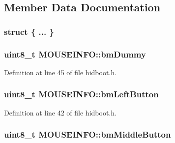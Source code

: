 \subsection{\-Member \-Data \-Documentation}
\hypertarget{struct_m_o_u_s_e_i_n_f_o_ac3f3397106dda169b0ed7791fa26f5af}{\subsubsection[{"@3}]{\setlength{\rightskip}{0pt plus 5cm}struct \{ ... \} }}\label{struct_m_o_u_s_e_i_n_f_o_ac3f3397106dda169b0ed7791fa26f5af}
\hypertarget{struct_m_o_u_s_e_i_n_f_o_a5ebb72d23926ca7891c2c4606be31ac3}{
\subsubsection[{bm\-Dummy}]{\setlength{\rightskip}{0pt plus 5cm}uint8\-\_\-t {\bf \-M\-O\-U\-S\-E\-I\-N\-F\-O\-::bm\-Dummy}}}\label{struct_m_o_u_s_e_i_n_f_o_a5ebb72d23926ca7891c2c4606be31ac3}


\-Definition at line 45 of file hidboot.\-h.

\hypertarget{struct_m_o_u_s_e_i_n_f_o_a848ceb3b38f0dc9e09a83612c1fa89ff}{
\subsubsection[{bm\-Left\-Button}]{\setlength{\rightskip}{0pt plus 5cm}uint8\-\_\-t {\bf \-M\-O\-U\-S\-E\-I\-N\-F\-O\-::bm\-Left\-Button}}}\label{struct_m_o_u_s_e_i_n_f_o_a848ceb3b38f0dc9e09a83612c1fa89ff}


\-Definition at line 42 of file hidboot.\-h.

\hypertarget{struct_m_o_u_s_e_i_n_f_o_a7fb48a7cb68cfc8db2bb8838694c0b51}{
\subsubsection[{bm\-Middle\-Button}]{\setlength{\rightskip}{0pt plus 5cm}uint8\-\_\-t {\bf \-M\-O\-U\-S\-E\-I\-N\-F\-O\-::bm\-Middle\-Button}}}\label{struct_m_o_u_s_e_i_n_f_o_a7fb48a7cb68cfc8db2bb8838694c0b51}


